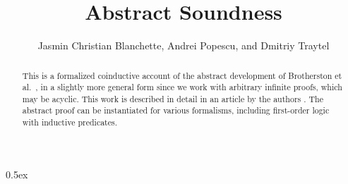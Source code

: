 \documentclass[11pt,a4paper]{article}
\begin{document}
\title{Abstract Soundness}
\author{Jasmin Christian Blanchette, Andrei Popescu, and Dmitriy Traytel}

\maketitle

\begin{abstract}
This is a formalized coinductive account of the abstract development of
Brotherston et al.\ \cite{brotherston-et-al-2012}, in a slightly more general
form since we work with arbitrary infinite proofs, which may be acyclic. This
work is described in detail in an article by the authors
\cite{blanchette-et-al-2017-co-methods}. The abstract proof can be
instantiated for various formalisms, including first-order logic with
inductive predicates.
\end{abstract}




\tableofcontents

\parindent 0pt\parskip 0.5ex


\end{document}

